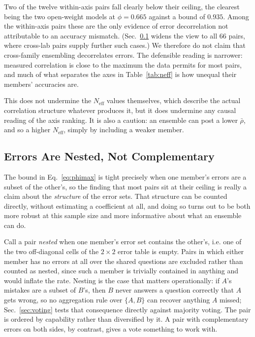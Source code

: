 \documentclass[conference]{IEEEtran}
\begin{document}
Two of the twelve within-axis pairs fall clearly below their ceiling, the
clearest being the two open-weight models at $\phi=0.665$ against a bound of
$0.935$. Among the within-axis pairs these are the only evidence of error
decorrelation not attributable to an accuracy mismatch.
(Sec.~\ref{sec:nesting} widens the view to all 66 pairs, where cross-lab
pairs supply further such cases.) We therefore do not claim that cross-family
ensembling decorrelates errors. The defensible reading is narrower: measured
correlation is close to the maximum the data permits for most pairs, and much
of what separates the axes in Table~\ref{tab:neff} is how unequal their
members' accuracies are.

This does not undermine the $N_\text{eff}$ values themselves, which describe
the actual correlation structure whatever produces it, but it does undermine
any causal reading of the axis ranking. It is also a caution: an ensemble
can post a lower $\bar\rho$, and so a higher $N_\text{eff}$, simply by
including a weaker member.

\subsection{Errors Are Nested, Not Complementary}
\label{sec:nesting}
The bound in Eq.~\ref{eq:phimax} is tight precisely when one member's errors
are a subset of the other's, so the finding that most pairs sit at their
ceiling is really a claim about the \emph{structure} of the error sets. That
structure can be counted directly, without estimating a coefficient at all,
and doing so turns out to be both more robust at this sample size and more
informative about what an ensemble can do.

Call a pair \emph{nested} when one member's error set contains the other's,
i.e. one of the two off-diagonal cells of the $2\times2$ error table is
empty. Pairs in which either member has no errors at all over the shared
questions are excluded rather than counted as nested, since such a member is
trivially contained in anything and would inflate the rate. Nesting is the case that matters operationally: if $A$'s mistakes are
a subset of $B$'s, then $B$ never answers a question correctly that $A$ gets
wrong, so no aggregation rule over $\{A,B\}$ can recover anything $A$ missed;
Sec.~\ref{sec:voting} tests that consequence directly against majority voting.
The pair is ordered by capability rather than diversified by it. A pair with
complementary errors on both sides, by contrast, gives a vote something to
work with.
\end{document}
